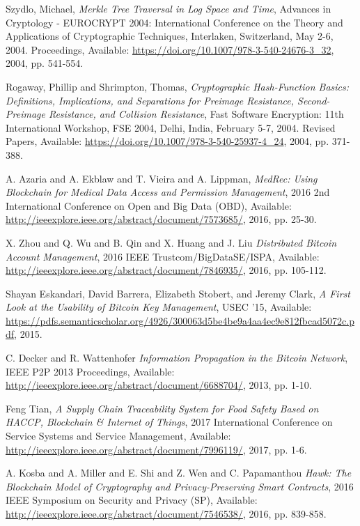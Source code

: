 \begin{thebibliography}{1}
  Szydlo, Michael,
  \emph{Merkle Tree Traversal in Log Space and Time},
  Advances in Cryptology - EUROCRYPT 2004: International Conference on the
Theory and Applications of Cryptographic Techniques, Interlaken, Switzerland,
May 2-6, 2004. Proceedings,
  Available: \url{https://doi.org/10.1007/978-3-540-24676-3_32},
  2004, pp. 541-554.

  Rogaway, Phillip and Shrimpton, Thomas,
  \emph{Cryptographic Hash-Function Basics: Definitions, Implications, and
Separations for Preimage Resistance, Second-Preimage Resistance, and Collision
Resistance},
  Fast Software Encryption: 11th International Workshop, FSE 2004, Delhi, India,
February 5-7, 2004. Revised Papers,
  Available: \url{https://doi.org/10.1007/978-3-540-25937-4_24},
  2004, pp. 371-388.

  A. Azaria and A. Ekblaw and T. Vieira and A. Lippman,
  \emph{MedRec: Using Blockchain for Medical Data Access and Permission
Management},
  2016 2nd International Conference on Open and Big Data (OBD),
  Available: \url{http://ieeexplore.ieee.org/abstract/document/7573685/},
  2016, pp. 25-30.

  X. Zhou and Q. Wu and B. Qin and X. Huang and J. Liu
  \emph{Distributed Bitcoin Account Management},
  2016 IEEE Trustcom/BigDataSE/ISPA,
  Available: \url{http://ieeexplore.ieee.org/abstract/document/7846935/},
  2016, pp. 105-112.

  Shayan Eskandari, David Barrera, Elizabeth Stobert, and Jeremy Clark,
  \emph{A First Look at the Usability of Bitcoin Key Management},
  USEC ’15,
  Available:
\url{
https://pdfs.semanticscholar.org/4926/300063d5be4be9a4aa4ec9e812fbcad5072c.pdf},
  2015.

  C. Decker and R. Wattenhofer
  \emph{Information Propagation in the Bitcoin Network},
  IEEE P2P 2013 Proceedings,
  Available: \url{http://ieeexplore.ieee.org/abstract/document/6688704/},
  2013, pp. 1-10.

  Feng Tian,
  \emph{A Supply Chain Traceability System for Food Safety
Based on HACCP, Blockchain \& Internet of Things},
  2017 International Conference on Service Systems and Service Management,
  Available: \url{http://ieeexplore.ieee.org/abstract/document/7996119/},
  2017, pp. 1-6.

  A. Kosba and A. Miller and E. Shi and Z. Wen and C. Papamanthou
  \emph{Hawk: The Blockchain Model of Cryptography and Privacy-Preserving Smart
Contracts},
  2016 IEEE Symposium on Security and Privacy (SP),
  Available: \url{http://ieeexplore.ieee.org/abstract/document/7546538/},
  2016, pp. 839-858.


\end{thebibliography}
